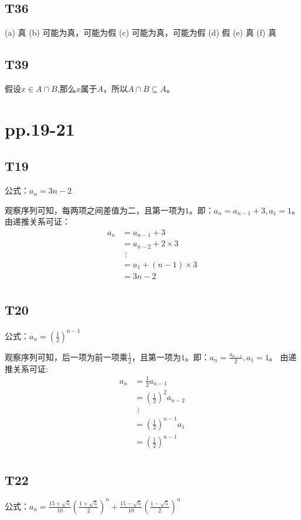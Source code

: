 \documentclass{article}
\begin{document}
\subsection{T36}
(a) 真 \quad (b) 可能为真，可能为假 \quad (c) 可能为真，可能为假 \quad (d) 假 \quad
(e) 真 \quad (f) 真

\subsection{T39}
假设$x \in A \cap B$,那么$x$属于$A$，所以$A \cap B \subseteq A$。

\section{pp.19-21}
\subsection{T19}
公式：$a_n = 3n - 2$

观察序列可知，每两项之间差值为二，且第一项为$1$。即：$a_n = a_{n - 1} + 3, a_1 = 1$。
由递推关系可证：
\begin{align*}
    a_n &= a_{n - 1} + 3\\
    &= a_{n - 2} + 2 \times 3\\
    &\ \,\vdots\\
    &= a_1 + (n - 1) \times 3\\
    &= 3n - 2\\
\end{align*}

\subsection{T20}
公式：$a_n = (\frac{1}{2})^{n - 1}$

观察序列可知，后一项为前一项乘$\frac{1}{2}$，且第一项为$1$。即：$a_n = \frac{a_{n-1}}{2}, a_1 = 1$。
由递推关系可证:
\begin{align*}
    a_n &= \frac{1}{2} a_{n - 1}\\
    &= (\frac{1}{2})^2 a_{n - 2}\\
    &\ \, \vdots\\
    &= (\frac{1}{2})^{n - 1} a_1\\
    &= (\frac{1}{2})^{n - 1}\\
\end{align*}

\subsection{T22}
公式：$a_n = \frac{15 + \sqrt{5}}{10}(\frac{1+\sqrt{5}}{2})^n + \frac{15 - \sqrt{5}}{10}(\frac{1-\sqrt{5}}{2})^n$
\end{document}
